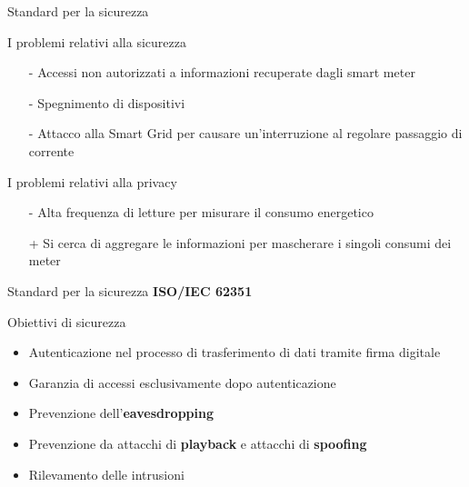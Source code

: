 


\begin{frame}{Standard per la sicurezza}
	\begin{block}{I problemi relativi alla sicurezza}
	\begin{itemize}
		\item[-] Accessi non autorizzati a informazioni recuperate dagli smart meter
		\item[-] Spegnimento di dispositivi
		\item[-] Attacco alla Smart Grid per causare un'interruzione al regolare passaggio di corrente
	\end{itemize}
	\end{block}		
	\pause
	\begin{block}{I problemi relativi alla privacy}
	\begin{itemize}
		\item[-] Alta frequenza di letture per misurare il consumo energetico
		\item[+] Si cerca di aggregare le informazioni per mascherare i singoli consumi dei meter
	\end{itemize}
	\end{block}		
\end{frame}

\begin{frame}{Standard per la sicurezza}
\textbf{ISO/IEC 62351}
\begin{block}{Obiettivi di sicurezza}
\begin{itemize}[<+- | alert@+>]
	\item Autenticazione nel processo di trasferimento di dati tramite firma digitale
	\item Garanzia di accessi esclusivamente dopo autenticazione
	\item Prevenzione dell'\textbf{\color{blue_slides}eavesdropping}%
	\item Prevenzione da attacchi di \textbf{\color{blue_slides}playback} e attacchi di \textbf{\color{blue_slides}spoofing}
	\item Rilevamento delle intrusioni
\end{itemize}
\end{block}
\end{frame}

